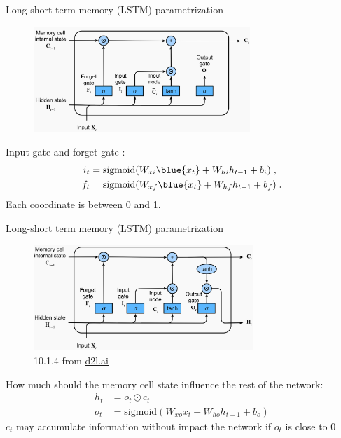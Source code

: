 \documentclass[usenames,dvipsnames,notes,11pt,aspectratio=169,hyperref={colorlinks=true, linkcolor=blue}]{beamer}
\begin{document}
\begin{frame}
    {Long-short term memory (LSTM) parametrization}
    \begin{figure}
        \includegraphics[height=4cm]{figures/lstm-2}
    \end{figure}

    Input gate and forget gate :
            \begin{align*}
                i_t &= \text{sigmoid}(W_{xi}\blue{x_t} + W_{hi}h_{t-1} + b_i) \;,\\
                f_t &= \text{sigmoid}(W_{xf}\blue{x_t} + W_{hf}h_{t-1} + b_f) \;.
            \end{align*}
    Each coordinate is between 0 and 1.
\end{frame}

\begin{frame}
    {Long-short term memory (LSTM) parametrization}
    \begin{figure}
        \includegraphics[height=4cm]{figures/lstm-3}
        \caption{10.1.4 from \href{https://d2l.ai/chapter_recurrent-modern/lstm.html}{d2l.ai}}
    \end{figure}
    How much should the memory cell state influence the rest of the network:
            \begin{align*}
 h_t &= o_t \odot c_t \\
 o_t &= \text{sigmoid}(W_{xo}x_t + W_{ho}h_{t-1} + b_o) 
            \end{align*}
    $c_t$ may accumulate information without impact the network if $o_t$ is close to 0
\end{frame}
\end{document}
